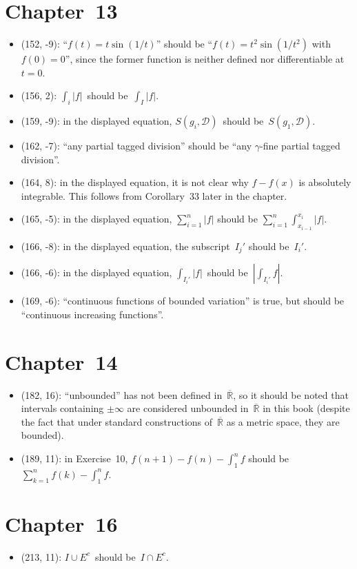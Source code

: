 \documentclass[letterpaper,12pt]{article}
\newcommand{\R}{\mathbb{R}}
\newcommand{\Rex}{\overline{\R}}
\newcommand{\D}{\mathcal{D}}
\newcommand{\union}{\cup}
\newcommand{\sect}{\cap}
\newcommand{\abs}[1]{|{#1}|}
\newcommand{\bigabs}[1]{\left|{#1}\right|}
\newcommand{\comp}[1]{#1^c}
\begin{document}
\section*{Chapter~13}
\begin{itemize}
\item (152, -9): ``\(f(t)=t\sin(1/t)\)'' should be ``\(f(t)=t^2\sin(1/t^2)\) with \(f(0)=0\)'', since the former function is neither defined nor differentiable at \(t=0\).
\item (156, 2): \(\int_i\abs{f}\)~should be~\(\int_I\abs{f}\).
\item (159, -9): in the displayed equation, \(S(g_i,\D)\)~should be~\(S(g_1,\D)\).
\item (162, -7): ``any partial tagged division'' should be ``any \(\gamma\)-fine partial tagged division''.
\item (164, 8): in the displayed equation, it is not clear why \(f-f(x)\) is absolutely integrable. This follows from Corollary~33 later in the chapter.
\item (165, -5): in the displayed equation, \(\sum_{i=1}^n\abs{f}\) should be \(\sum_{i=1}^n\int_{x_{i-1}}^{x_i}\abs{f}\).
\item (166, -8): in the displayed equation, the subscript~\(I_j'\) should be~\(I_i'\).
\item (166, -6): in the displayed equation, \(\int_{I_i'}\abs{f}\)~should be~\(\bigabs{\int_{I_i'}f}\).
\item (169, -6): ``continuous functions of bounded variation'' is true, but should be ``continuous increasing functions''.
\end{itemize}

\section*{Chapter~14}
\begin{itemize}
\item (182, 16): ``unbounded'' has not been defined in~\(\Rex\), so it should be noted that intervals containing \(\pm\infty\) are considered unbounded in~\(\Rex\) in this book (despite the fact that under standard constructions of~\(\Rex\) as a metric space, they are bounded).
\item (189, 11): in Exercise~10, \(f(n+1)-f(n)-\int_1^n f\) should be \(\sum_{k=1}^n f(k)-\int_1^n f\).
\end{itemize}

\section*{Chapter~16}
\begin{itemize}
\item (213, 11): \(I\union\comp{E}\)~should be~\(I\sect\comp{E}\).
\end{itemize}
\end{document}
